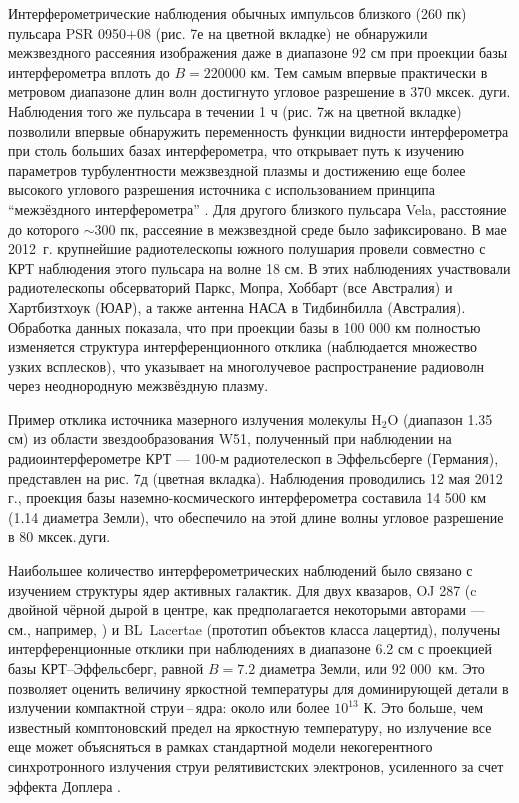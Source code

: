Интерферометрические наблюдения обычных импульсов близкого (260 пк) пульсара PSR 0950+08 (рис. 7е на
цветной вкладке) не обнаружили межзвездного рассеяния изображения даже в диапазоне 92 см при
проекции базы интерферометра вплоть до $B=220 000$ км. Тем самым впервые практически в метровом
диапазоне длин волн достигнуто угловое разрешение в  370 мксек. дуги. Наблюдения того же пульсара в
течении 1 ч (рис. 7ж на цветной вкладке) позволили впервые обнаружить переменность функции видности
интерферометра при столь больших базах интерферометра, что открывает путь к изучению параметров
турбулентности межзвездной плазмы и достижению еще более высокого углового разрешения источника с
использованием принципа ``межзёздного интерферометра'' \cite{Wolszczan_1987}. Для другого близкого
пульсара Vela, расстояние до которого $\sim 300$ пк, рассеяние в межзвездной среде было
зафиксировано. В мае 2012~г. крупнейшие радиотелескопы южного полушария провели совместно с КРТ
наблюдения этого пульсара на волне 18 см. В этих наблюдениях участвовали радиотелескопы обсерваторий
Паркс, Мопра, Хоббарт (все Австралия) и Хартбизтхоук (ЮАР), а также антенна НАСА в Тидбинбилла
(Австралия). Обработка данных показала, что при проекции базы в 100 000 км полностью изменяется
структура интерференционного отклика (наблюдается множество узких всплесков), что указывает на
многолучевое распространение радиоволн через неоднородную межзвёздную плазму.

Пример отклика источника мазерного излучения молекулы H$_2$O (диапазон 1.35 см) из области
звездообразования W51, полученный при наблюдении на радиоинтерферометре КРТ --- 100-м  радиотелескоп
в Эффельсберге (Германия), представлен на рис. 7д (цветная вкладка). Наблюдения проводились 12 мая
2012 г., проекция базы наземно-космического интерферометра составила 14 500 км (1.14 диаметра
Земли), что обеспечило на этой длине волны угловое разрешение в 80 мксек.\,дуги.

Наибольшее количество интерферометрических наблюдений было связано с изучением структуры ядер
активных галактик. Для двух квазаров, OJ 287 (c двойной чёрной дырой в центре, как предполагается
некоторыми авторами --- см., например, \cite{Valtonen_2011}) и BL~Lacertae (прототип объектов класса
лацертид), получены интерференционные отклики при наблюдениях в диапазоне 6.2 см с проекцией базы
КРТ--Эффельсберг, равной $B = 7.2$ диаметра Земли, или 92 000~км. Это позволяет оценить величину
яркостной температуры для доминирующей детали в излучении компактной струи\,--\,ядра: около или
более $10^{13}$ К. Это больше, чем известный комптоновский предел \cite{Kellermann_1969} на
яркостную температуру, но излучение все еще может объясняться в рамках стандартной модели
некогерентного синхротронного излучения струи релятивистских электронов, усиленного за счет эффекта
Доплера \cite{Cohen_2007}.

